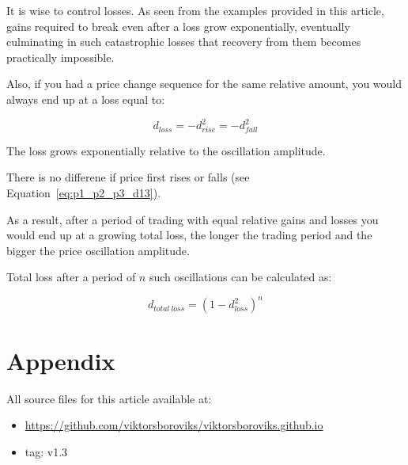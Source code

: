 \documentclass[a4paper]{article}
\begin{document}
It is wise to control losses.
As seen from the examples provided in this article, gains required to
break even after a loss grow exponentially, eventually culminating in such
catastrophic losses that recovery from them becomes practically impossible.

Also, if you had a price change sequence for the same relative amount,
you would always end up at a loss equal to:

\begin{equation}
  \boxed{d_{loss} = -d_{rise}^2 = -d_{fall}^2}
\end{equation}

The loss grows exponentially relative to the oscillation amplitude.

There is no differene if price first rises or falls (see Equation~\ref{eq:p1_p2_p3_d13}).

As a result, after a period of trading with equal relative gains and losses
you would end up at a growing total loss, the longer the trading period and
the bigger the price oscillation amplitude.

Total loss after a period of $n$ such oscillations can be calculated as:

\begin{equation}
  \boxed{d_{total~loss} = (1 - d_{loss}^2)^n}
\end{equation}

\clearpage
\section*{Appendix}

All source files for this article available at:

\begin{itemize}
\item \url{https://github.com/viktorsboroviks/viktorsboroviks.github.io}
\item tag: v1.3
\end{itemize}


\begin{onecolumn}

\begin{versionhistory}
\end{versionhistory}

\end{onecolumn}
\end{document}

